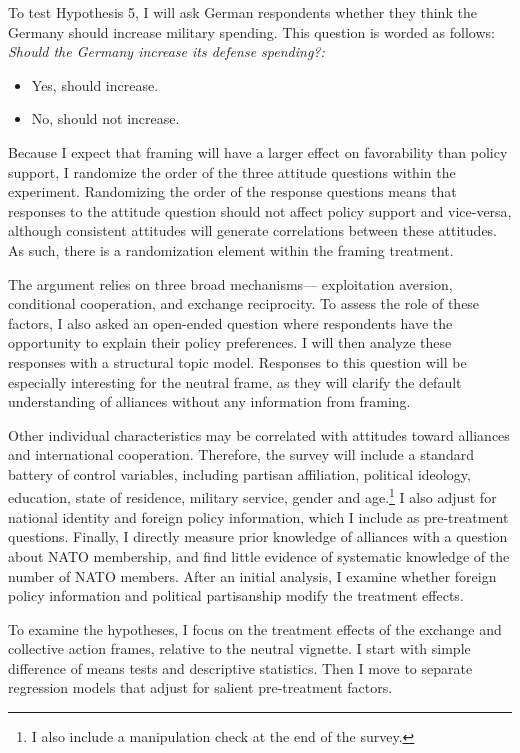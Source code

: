 \documentclass[12pt]{article}
\begin{document}
To test Hypothesis 5, I will ask German respondents whether they think the Germany should increase military spending.
This question is worded as follows: \textit{Should the Germany increase its defense spending?:} 
\begin{itemize}
\item Yes, should increase.
\item No, should not increase. 
\end{itemize}


Because I expect that framing will have a larger effect on favorability than policy support, I randomize the order of the three attitude questions within the experiment. 
Randomizing the order of the response questions means that responses to the attitude question should not affect policy support and vice-versa, although consistent attitudes will generate correlations between these attitudes.
As such, there is a randomization element within the framing treatment.  


The argument relies on three broad mechanisms--- exploitation aversion, conditional cooperation, and exchange reciprocity. 
To assess the role of these factors, I also asked an open-ended question where respondents have the opportunity to explain their policy preferences.
I will then analyze these responses with a structural topic model. %
Responses to this question will be especially interesting for the neutral frame, as they will clarify the default understanding of alliances without any information from framing.


Other individual characteristics may be correlated with attitudes toward alliances and international cooperation. 
Therefore, the survey will include a standard battery of control variables, including partisan affiliation, political ideology, education, state of residence, military service, gender and age.\footnote{I also include a manipulation check at the end of the survey.} 
I also adjust for national identity \citep{Herrmannetal2009} and foreign policy information, which I include as pre-treatment questions. 
Finally, I directly measure prior knowledge of alliances with a question about NATO membership, and find little evidence of systematic knowledge of the number of NATO members. 
After an initial analysis, I examine whether foreign policy information and political partisanship modify the treatment effects.


To examine the hypotheses, I focus on the treatment effects of the exchange and collective action frames, relative to the neutral vignette. 
I start with simple difference of means tests and descriptive statistics. 
Then I move to separate regression models that adjust for salient pre-treatment factors. 
\end{document}
